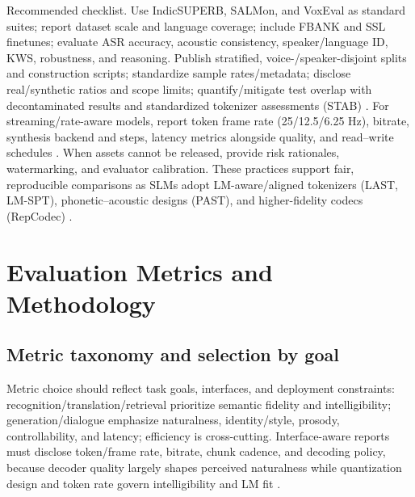 \documentclass{article}
\begin{document}
Recommended checklist. Use IndicSUPERB, SALMon, and VoxEval as standard suites; report dataset scale and language coverage; include FBANK and SSL finetunes; evaluate ASR accuracy, acoustic consistency, speaker/language ID, KWS, robustness, and reasoning. Publish stratified, voice-/speaker-disjoint splits and construction scripts; standardize sample rates/metadata; disclose real/synthetic ratios and scope limits; quantify/mitigate test overlap with decontaminated results and standardized tokenizer assessments (STAB) \cite{vashishth2024stabspeechtokenizerassessmentbenchmark}. For streaming/rate-aware models, report token frame rate (25/12.5/6.25 Hz), bitrate, synthesis backend and steps, latency metrics alongside quality, and read--write schedules \cite{zhang2025impactframeratesspeechtokenizercasestudy}. When assets cannot be released, provide risk rationales, watermarking, and evaluator calibration. These practices support fair, reproducible comparisons as SLMs adopt LM-aware/aligned tokenizers (LAST, LM-SPT), phonetic--acoustic designs (PAST), and higher-fidelity codecs (RepCodec) \cite{turetzky2024lastlanguagemodelawarespeechtokenization,jo2025lmsptalignedsemanticdistillationspeechto,har-tuv2025pastphoneticacousticspeechtokenizer,huang2024repcodecspeechrepresentationcodectokeniz}.

















\section{Evaluation Metrics and Methodology} \label{sec:Evaluation Metrics and Methodology}

\subsection{Metric taxonomy and selection by goal} \label{subsec:Metric taxonomy and selection by goal}
Metric choice should reflect task goals, interfaces, and deployment constraints: recognition/translation/retrieval prioritize semantic fidelity and intelligibility; generation/dialogue emphasize naturalness, identity/style, prosody, controllability, and latency; efficiency is cross-cutting. Interface-aware reports must disclose token/frame rate, bitrate, chunk cadence, and decoding policy, because decoder quality largely shapes perceived naturalness while quantization design and token rate govern intelligibility and LM fit \cite{turetzky2024lastlanguagemodelawarespeechtokenization,zhang2025impactframeratesspeechtokenizercasestudy,li2024investigatingneuralaudiocodecsspeechlang}.
\end{document}
